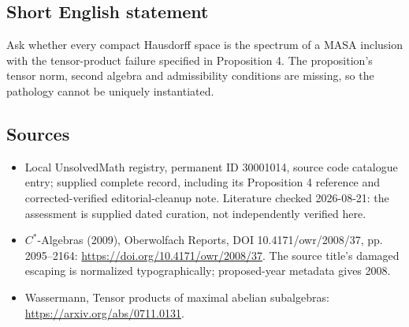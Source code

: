 \documentclass[11pt]{article}
\begin{document}
\subsection{Short English statement}
Ask whether every compact Hausdorff space is the spectrum of a MASA inclusion with the tensor-product failure specified in Proposition 4. The proposition's tensor norm, second algebra and admissibility conditions are missing, so the pathology cannot be uniquely instantiated.
\subsection{Sources}
\begin{itemize}
\item Local UnsolvedMath registry, permanent ID 30001014, source code catalogue entry; supplied complete record, including its Proposition 4 reference and corrected-verified editorial-cleanup note. Literature checked 2026-08-21: the assessment is supplied dated curation, not independently verified here.
\item $C^*$-Algebras (2009), Oberwolfach Reports, DOI 10.4171/owr/2008/37, pp. 2095--2164: \url{https://doi.org/10.4171/owr/2008/37}. The source title's damaged escaping is normalized typographically; proposed-year metadata gives 2008.
\item Wassermann, Tensor products of maximal abelian subalgebras: \url{https://arxiv.org/abs/0711.0131}.
\end{itemize}
\end{document}
